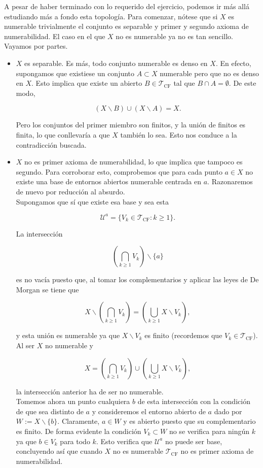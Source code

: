 A pesar de haber terminado con lo requerido del ejercicio, podemos ir más allá estudiando más a fondo esta topología. Para comenzar, nótese que si $X$ es numerable trivialmente el conjunto es separable y primer y segundo axioma de numerabilidad. El caso en el que $X$ no es numerable ya no es tan sencillo. Vayamos por partes.

\begin{itemize}
\item $X$ es separable. Es más, todo conjunto numerable es denso en $X$. En efecto, supongamos que existiese un conjunto $A \subset X$ numerable pero que no es denso en $X$. Esto implica que existe un abierto $B\in \mathcal{T}_{\text{CF}}$ tal que $B\cap A = \emptyset$. De este modo, 

\[(X\backslash B)\cup (X\backslash A)=X.\]

Pero los conjuntos del primer miembro son finitos, y la unión de finitos es finita, lo que conllevaría a que $X$ también lo sea. Esto nos conduce a la  contradicción buscada. 

\item $X$ no es primer axioma de numerabilidad, lo que implica que tampoco es segundo. Para corroborar esto, comprobemos que para cada punto $a\in X$ no existe una base de entornos abiertos numerable centrada en $a$. Razonaremos de nuevo por reducción al absurdo. \\

Supongamos que sí que existe esa base y sea esta 

\[\mathcal{U}^a=\{V_k \in\mathcal{T}_{\text{CF}}: k \geq 1\}.\]

La intersección 

\[\left(\bigcap_{k\geq 1} V_k\right)\backslash \{a\}\]

es no vacía puesto que, al tomar los complementarios y aplicar las leyes de De Morgan se tiene que 

\[X \backslash \left(\bigcap_{k\geq 1} V_k\right)= \left(\bigcup_{k\geq 1} X \backslash V_k\right), \]

y esta unión es numerable ya que $X \backslash V_k$ es finito (recordemos que $V_k \in \mathcal{T}_{\text{CF}}$). Al ser $X$ no numerable y 

\[X= \left(\bigcap_{k\geq 1} V_k\right) \cup \left(\bigcup_{k\geq 1} X\backslash V_k\right),\]

la intersección anterior ha de ser no numerable. \\

Tomemos ahora un punto cualquiera $b$ de esta intersección con la condición de que sea distinto de $a$ y consideremos el entorno abierto de $a$ dado por $W:=X\backslash \{b\}$. Claramente, $a\in W$ y es abierto puesto que su complementario es finito.  De forma evidente la condición $V_k \subset W$ no se verifica para ningún $k$ ya que $b\in V_k$ para todo $k$. Esto verifica que $\mathcal{U}^a$ no puede ser base, concluyendo así que cuando $X$ no es numerable $\mathcal{T}_{\text{CF}}$ no es primer axioma de numerabilidad.


\end{itemize}
